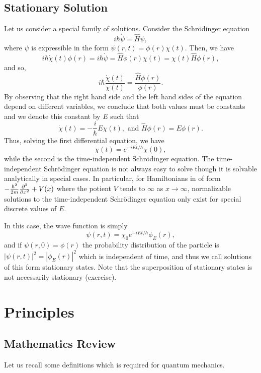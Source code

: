 \documentclass[]{article}
\theoremstyle{definition}
\theoremstyle{definition}
\begin{document}
\subsection{Stationary Solution}

Let us consider a special family of solutions. Consider the Schrödinger equation 
\[i\hbar \dot \psi = \hat H \psi,\]
where \(\psi\) is expressible in the form \(\psi(r, t) = \phi(r)\chi(t)\). Then,
we have 
\[i\hbar \dot \chi(t) \phi(r) = 
  i\hbar \dot \psi = 
  \hat H \phi(r) \chi(t) = \chi(t) \hat H \phi(r),\]
and so,
\[i\hbar \frac{\dot \chi(t)}{\chi(t)} = \frac{\hat H \phi(r)}{\phi(r)}.\]
By observing that the right hand side and the left hand sides of the equation 
depend on different variables, we conclude that both values must be constants 
and we denote this constant by \(E\) such that 
\[\dot \chi(t) = - \frac{i}{\hbar}E \chi(t), \text{ and } 
  \hat H \phi(r) = E \phi(r).\]
Thus, solving the first differential equation, we have 
\[\chi(t) = e^{-iEt / \hbar}\chi(0),\]
while the second is the time-independent Schrödinger equation.
The time-independent Schrödinger equation is not always easy to solve though 
it is solvable analytically in special cases. In particular, for Hamiltonians 
in of form \(- \frac{\hbar^2}{2m} \pdv[2]{x} + V(x)\) where the potient \(V\) 
tends to \(\infty\) as \(x \to \infty\), normalizable solutions to the 
time-independent Schrödinger equation only exist for special discrete 
values of \(E\).

In this case, the wave function is simply 
\[\psi(r, t) = \chi_0 e^{-iEt/ \hbar} \phi_E(r),\]
and if \(\psi(r, 0) = \phi(r)\) the probability distribution of the particle is
\(|\psi(r, t)|^2 = |\phi_E(r)|^2\) which is independent of time, and thus 
we call solutions of this form stationary states. Note that the superposition 
of stationary states is not necessarily stationary (exercise).

\newpage
\section{Principles}

\subsection{Mathematics Review}

Let us recall some definitions which is required for quantum mechanics. 
\end{document}
